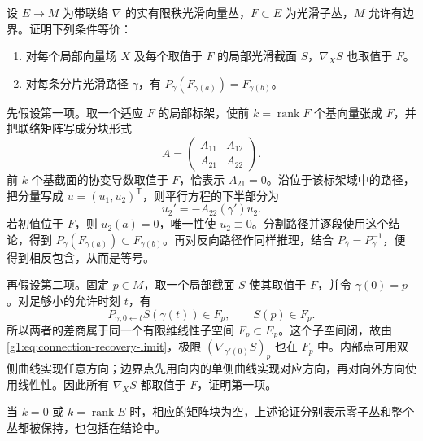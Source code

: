 \begin{exercise}\label{g1:ex:parallel-invariant-subbundle}
	设 \(E\to M\) 为带联络 \(\nabla\) 的实有限秩光滑向量丛，\(F\subset E\) 为光滑子丛，\(M\) 允许有边界。证明下列条件等价：
	\begin{enumerate}
		\item 对每个局部向量场 \(X\) 及每个取值于 \(F\) 的局部光滑截面 \(S\)，\(\nabla_XS\) 也取值于 \(F\)。
		\item 对每条分片光滑路径 \(\gamma\)，有 \(P_\gamma(F_{\gamma(a)})=F_{\gamma(b)}\)。
	\end{enumerate}
\end{exercise}
\begin{solution}
	先假设第一项。取一个适应 \(F\) 的局部标架，使前 \(k=\operatorname{rank}F\) 个基向量张成 \(F\)，并把联络矩阵写成分块形式
	\[
		A=\begin{pmatrix}A_{11}&A_{12}\\A_{21}&A_{22}\end{pmatrix}.
	\]
	前 \(k\) 个基截面的协变导数取值于 \(F\)，恰表示 \(A_{21}=0\)。沿位于该标架域中的路径，把分量写成 \(u=(u_1,u_2)^{\mathsf T}\)，则平行方程的下半部分为
	\[
		u_2'=-A_{22}(\gamma')u_2.
	\]
	若初值位于 \(F\)，则 \(u_2(a)=0\)，唯一性使 \(u_2\equiv0\)。分割路径并逐段使用这个结论，得到 \(P_\gamma(F_{\gamma(a)})\subset F_{\gamma(b)}\)。再对反向路径作同样推理，结合 \(P_{\overline\gamma}=P_\gamma^{-1}\)，便得到相反包含，从而是等号。

	再假设第二项。固定 \(p\in M\)，取一个局部截面 \(S\) 使其取值于 \(F\)，并令 \(\gamma(0)=p\)。对足够小的允许时刻 \(t\)，有
	\[
		P_{\gamma,0\leftarrow t}S(\gamma(t))\in F_p,\qquad S(p)\in F_p.
	\]
	所以两者的差商属于同一个有限维线性子空间 \(F_p\subset E_p\)。这个子空间闭，故由\eqref{g1:eq:connection-recovery-limit}，极限 \((\nabla_{\gamma'(0)}S)_p\) 也在 \(F_p\) 中。内部点可用双侧曲线实现任意方向；边界点先用向内的单侧曲线实现对应方向，再对向外方向使用线性性。因此所有 \(\nabla_XS\) 都取值于 \(F\)，证明第一项。

	当 \(k=0\) 或 \(k=\operatorname{rank}E\) 时，相应的矩阵块为空，上述论证分别表示零子丛和整个丛都被保持，也包括在结论中。
\end{solution}

